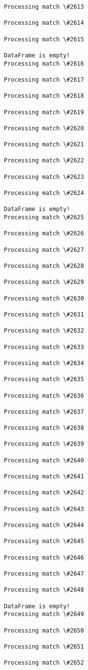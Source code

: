 \documentclass[11pt]{article}
\begin{document}
\begin{Verbatim}[commandchars=\\\{\}]
Processing match \#2613

Processing match \#2614

Processing match \#2615

DataFrame is empty!
Processing match \#2616

Processing match \#2617

Processing match \#2618

Processing match \#2619

Processing match \#2620

Processing match \#2621

Processing match \#2622

Processing match \#2623

Processing match \#2624

DataFrame is empty!
Processing match \#2625

Processing match \#2626

Processing match \#2627

Processing match \#2628

Processing match \#2629

Processing match \#2630

Processing match \#2631

Processing match \#2632

Processing match \#2633

Processing match \#2634

Processing match \#2635

Processing match \#2636

Processing match \#2637

Processing match \#2638

Processing match \#2639

Processing match \#2640

Processing match \#2641

Processing match \#2642

Processing match \#2643

Processing match \#2644

Processing match \#2645

Processing match \#2646

Processing match \#2647

Processing match \#2648

DataFrame is empty!
Processing match \#2649

Processing match \#2650

Processing match \#2651

Processing match \#2652


\end{Verbatim}
\end{document}
